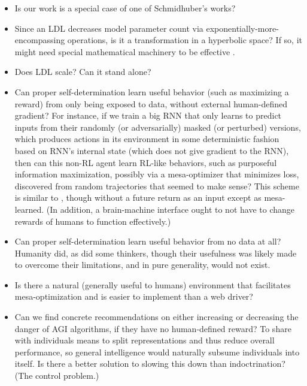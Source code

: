 \documentclass{article}
\begin{document}
\begin{itemize}
\item Is our work is a special case of one of Schmidhuber's works?

\item Since an LDL decreases model parameter count via exponentially-more-encompassing operations, is it a transformation in a hyperbolic space? If so, it might need special mathematical machinery to be effective \cite{peng2021hyperbolic}.

\item Does LDL scale? Can it stand alone?

\item Can proper self-determination learn useful behavior (such as maximizing a reward) from only being exposed to data, without external human-defined gradient? For instance, if we train a big RNN that only learns to predict inputs from their randomly (or adversarially) masked (or perturbed) versions, which produces actions in its environment in some deterministic fashion based on RNN's internal state (which does not give gradient to the RNN), then can this non-RL agent learn RL-like behaviors, such as purposeful information maximization, possibly via a mesa-optimizer that minimizes loss, discovered from random trajectories that seemed to make sense? This scheme is similar to \cite{schmidhuber2020reinforcement}, though without a future return as an input except as mesa-learned. (In addition, a brain-machine interface ought to not have to change rewards of humans to function effectively.)

\item Can proper self-determination learn useful behavior from no data at all? Humanity did, as did some thinkers, though their usefulness was likely made to overcome their limitations, and in pure generality, would not exist.

\item Is there a natural (generally useful to humans) environment that facilitates mesa-optimization and is easier to implement than a web driver?

\item Can we find concrete recommendations on either increasing or decreasing the danger of AGI algorithms, if they have no human-defined reward? To share with individuals means to split representations and thus reduce overall performance, so general intelligence would naturally subsume individuals into itself. Is there a better solution to slowing this down than indoctrination? (The control problem.)
\end{itemize}
\end{document}
